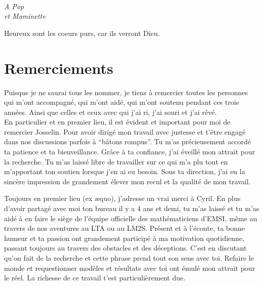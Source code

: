 \documentclass[a4paper]{book}
\begin{document}

\cleardoublepage\normalsize
\ 
\vfill
\begin{FlushRight}\itshape
A Pop\\
et Maminette

\vfill\normalshape
Heureux sont les coeurs purs, car ils verront Dieu. %


\end{FlushRight}

\newpage


\chapter*{Remerciements}
\pagestyle{plain}

Puisque je ne saurai tous les nommer, je tiens à remercier toutes les personnes qui m'ont accompagné, qui m'ont aidé, qui m'ont soutenu pendant ces trois années. Ainsi  que celles et ceux avec qui j'ai ri, j'ai souri et j'ai rêvé. \\


En particulier et en premier lieu, 
il est évident et important pour moi de remercier Josselin. Pour avoir dirigé mon travail avec justesse et t'être engagé dans nos discussions parfois à ``bâtons rompus''. Tu m'as précieusement accordé ta patience et ta bienveillance. %
Grâce à ta confiance, 
j'ai éveillé mon attrait pour la recherche. Tu m'as laissé libre de travailler sur ce qui m'a plu tout en m'apportant ton soutien lorsque j'en ai eu besoin. Sous ta direction, j'ai eu la sincère impression de grandement élever mon recul et la qualité de mon travail. 

 

Toujours en premier lieu (ex æquo), j'adresse un vrai merci à Cyril. 
En plus d'avoir partagé avec moi ton bureau il y a 4 ans et demi, 
tu m'as laissé et tu m'as aidé à en faire le siège de l'équipe officielle des mathématiciens d'EMSI, même au travers de nos aventures au LTA ou au LM2S. %
Présent et à l'écoute, ta bonne humeur et ta passion ont grandement participé à ma motivation quotidienne, passant toujours au travers des obstacles et des déceptions. 
C'est en discutant qu'on fait de la recherche et cette phrase prend tout son sens avec toi. 
Refaire le monde et requestionner modèles et résultats avec toi ont émulé mon attrait pour le réel. La richesse de ce travail t'est particulièrement due. 
\end{document}
